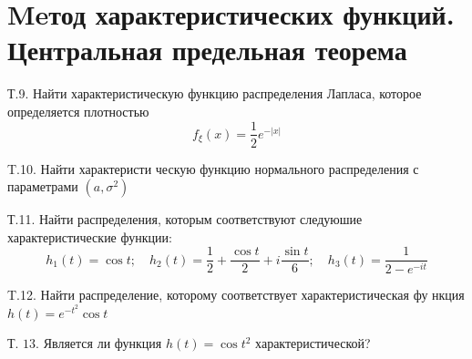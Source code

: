 \documentclass[a4paper,12pt]{article} %
\begin{document}
\section{Meтод характеристических функций. Центральная предельная теорема}



\begin{example}


Т.9. Найти характеристическую функцию распределения Лапласа, которое определяется плотностью
$$
f_{\xi}(x)=\frac{1}{2} e^{-|x|}
$$





\end{example}



\begin{example}

T.10. Найти характеристи ческую функцию нормального распределения с параметрами $\left(a, \sigma^{2}\right)$




\end{example}



\begin{example}

Т.11. Найти распределения, которым соответствуют следуюшие характеристические функции:
$$
h_{1}(t)=\cos t ; \quad h_{2}(t)=\frac{1}{2}+\frac{\cos t}{2}+i \frac{\sin t}{6} ; \quad h_{3}(t)=\frac{1}{2-e^{-i t}}
$$




\end{example}





\begin{example}


T.12. Найти распределение, которому соответствует характеристическая фу нкция $h(t)=e^{-t^{2}} \cos t$



\end{example}







\begin{example}

Т. $13 .$ Является ли функция $h(t)=\cos t^{2}$ характеристической?




\end{example}
\end{document}

